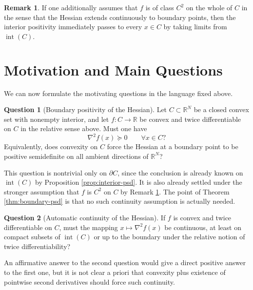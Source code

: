 \documentclass[reqno]{amsart}
\theoremstyle{definition}
\newtheorem{remark}[theorem]{Remark}
\newtheorem{question}{Question}
\newcommand{\R}{\mathbb{R}}
\begin{document}
\begin{remark}\label{rem:c2-boundary}
If one additionally assumes that $f$ is of class $C^2$ on the whole of $C$ in
the sense that the Hessian extends continuously to boundary points, then the
interior positivity immediately passes to every $x \in C$ by taking limits from
$\operatorname{int}(C)$.
\end{remark}

\section{Motivation and Main Questions}\label{sec:problem-statement}

We can now formulate the motivating questions in the language fixed above.

\begin{question}[Boundary positivity of the Hessian]\label{q:boundary-psd}
Let $C \subset \R^N$ be a closed convex set with nonempty interior, and let
$f \colon C \to \R$ be convex and twice differentiable on $C$ in the relative
sense above. Must one have
\begin{equation}
    \nabla^2 f(x) \succeq 0 \qquad \forall x \in C?
\end{equation}
Equivalently, does convexity on $C$ force the Hessian at a boundary point to be
positive semidefinite on all ambient directions of $\R^N$?
\end{question}

This question is nontrivial only on $\partial C$, since the conclusion is already
known on $\operatorname{int}(C)$ by Proposition \ref{prop:interior-psd}. It is
also already settled under the stronger assumption that $f$ is $C^2$ on $C$ by
Remark \ref{rem:c2-boundary}. The point of Theorem \ref{thm:boundary-psd} is
that no such continuity assumption is actually needed.

\begin{question}[Automatic continuity of the Hessian]\label{q:hessian-continuity}
If $f$ is convex and twice differentiable on $C$, must the mapping
$x \mapsto \nabla^2 f(x)$ be continuous, at least on compact subsets of
$\operatorname{int}(C)$ or up to the boundary under the relative notion of
twice differentiability?
\end{question}

An affirmative answer to the second question would give a direct positive answer
to the first one, but it is not clear a priori that convexity plus existence of
pointwise second derivatives should force such continuity.
\end{document}
